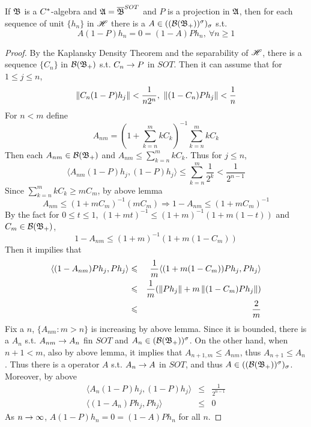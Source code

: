 \begin{lem}
	If $\mathfrak{B}$ is a $C^{*}$-algebra and $\mathfrak{A} = \overline{\mathfrak{B}}^{SOT}$ and $P$ is a projection in $\mathfrak{A}$, then for each sequence of unit $\{h_n\}$ in $\mathscr{H}$  there is a $A \in ((\mathcal{B}(\mathfrak{B}_+))^{\sigma})_{\sigma}$ s.t.
	\begin{equation*}
		A(1-P)h_n = 0  = (1-A)Ph_n,~ \forall  n \geqslant 1
	\end{equation*}
\end{lem}
\begin{proof}
	By the Kaplansky Density Theorem and the separability of $\mathscr{H}$, there is a sequence $\{C_n\}$ in $\mathcal{B}(\mathfrak{B}_+)$ s.t. $C_n \rightarrow P$ in $SOT$. Then it can assume that for $1 \leqslant j \leqslant  n$,
	\begin{equation*}
		\left\lVert C_n(1-P)h_j\right\lVert < \frac{1}{n2^n},~ \left\lVert(1-C_n)Ph_j\right\lVert < \frac{1}{n}
	\end{equation*}
	For $n < m$ define
	\begin{equation*}
		A_{nm} = \left(1+ \sum_{k=n}^m kC_k \right)^{-1}\sum_{k=n}^m kC_k
	\end{equation*}
	Then each $A_{nm} \in \mathcal{B}(\mathfrak{B}_+)$ and $A_{nm} \leqslant \sum_{k=n}^m kC_k$. Thus for $j \leqslant n$,
	\begin{equation*}
		\langle A_{nm}(1-P)h_j, (1-P)h_j \rangle \leqslant \sum_{k=n}^m \frac{1}{2^k} < \frac{1}{2^{n-1}}
	\end{equation*}
	Since $\sum_{k=n}^m kC_k \geqslant mC_m$, by above lemma
	\begin{equation*}
		A_{nm} \leqslant (1+mC_m)^{-1} (mC_m) \Rightarrow 1-A_{nm} \leqslant (1+mC_m)^{-1}
	\end{equation*}
	By the fact for $0 \leqslant t \leqslant 1$, $(1+mt)^{-1} \leqslant (1+m)^{-1}(1+m(1-t))$ and $C_m \in \mathcal{B}(\mathfrak{B}_+)$, 
	\begin{equation*}
		1- A_{nm} \leqslant (1+m)^{-1}(1+m(1-C_m))
	\end{equation*}
	Then it impilies that
	\begin{eqnarray*}
		\langle (1-A_{nm})Ph_j,Ph_j \rangle &\leqslant& \frac{1}{m} \langle (1+m(1-C_m))Ph_j,Ph_j \rangle \\
		&\leqslant& \frac{1}{m} (\left\lVert Ph_j\right\lVert+m\left\lVert(1-C_m)Ph_j\right\lVert) \\
		&\leqslant& \frac{2}{m}
	\end{eqnarray*}
	Fix a $n$, $\{A_{nm} \colon m > n\}$ is increasing by above lemma. Since it is bounded, there is a $A_n$  s.t. $A_{nm} \rightarrow A_n$ fin $SOT$ and $A_n \in (\mathcal{B}(\mathfrak{B}_+))^{\sigma}$. On the other hand, when $n+1 < m$, also by above lemma, it implies that $A_{n+1,m} \leqslant A_{nm}$, thus $A_{n+1} \leqslant A_n$. Thus there is a operator $A$ s.t. $A_n \rightarrow A$ in $SOT$, and thus $A \in ((\mathcal{B}(\mathfrak{B}_+))^{\sigma})_{\sigma}$. Moreover, by above
	\begin{eqnarray*}
		\langle A_n(1-P)h_j, (1-P)h_j \rangle &\leqslant& \frac{1}{2^{n-1}} \\
		\langle (1-A_n)Ph_j,Ph_j \rangle &\leqslant& 0
	\end{eqnarray*}
	As $n \rightarrow \infty$, $A(1-P)h_n = 0  = (1-A)Ph_n$ for all $n$.
\end{proof}

